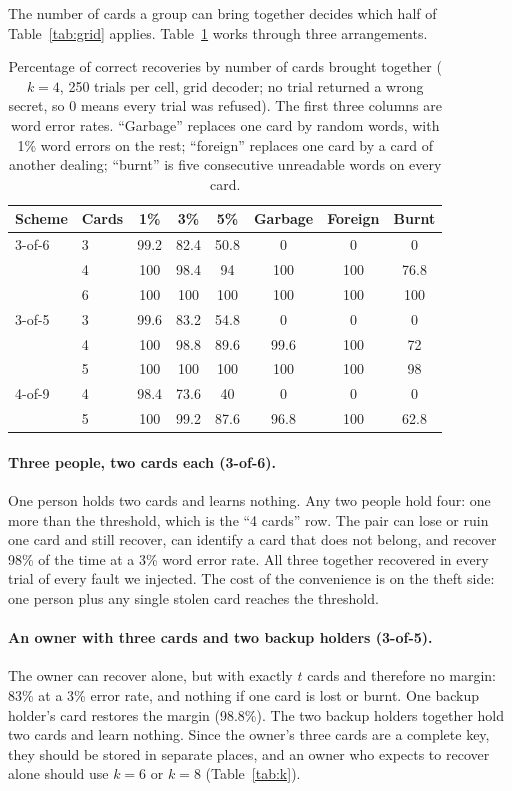 \documentclass[numeric]{anvil-paper}
\begin{document}
The number of cards a group can bring together decides which half of
Table~\ref{tab:grid} applies. Table~\ref{tab:scen} works through three
arrangements.

\begin{table}[tb]
\centering
\caption{Percentage of correct recoveries by number of cards brought together
($k=4$, 250 trials per cell, grid decoder; no trial returned a wrong secret,
so 0 means every trial was refused). The first three columns are word error
rates. ``Garbage'' replaces one card by random words, with 1\% word errors on
the rest; ``foreign'' replaces one card by a card of another dealing;
``burnt'' is five consecutive unreadable words on every card.}
\label{tab:scen}
\small
\begin{tabular}{llcccccc}
\toprule
Scheme & Cards & 1\% & 3\% & 5\% & Garbage & Foreign & Burnt \\
\midrule
3-of-6 & 3 & 99.2 & 82.4 & 50.8 & 0 & 0 & 0 \\
 & 4 & 100 & 98.4 & 94 & 100 & 100 & 76.8 \\
 & 6 & 100 & 100 & 100 & 100 & 100 & 100 \\
\midrule
3-of-5 & 3 & 99.6 & 83.2 & 54.8 & 0 & 0 & 0 \\
 & 4 & 100 & 98.8 & 89.6 & 99.6 & 100 & 72 \\
 & 5 & 100 & 100 & 100 & 100 & 100 & 98 \\
\midrule
4-of-9 & 4 & 98.4 & 73.6 & 40 & 0 & 0 & 0 \\
 & 5 & 100 & 99.2 & 87.6 & 96.8 & 100 & 62.8 \\
\bottomrule
\end{tabular}
\end{table}

\paragraph{Three people, two cards each (3-of-6).}
One person holds two cards and learns nothing. Any two people hold four: one
more than the threshold, which is the ``4 cards'' row. The pair can lose or
ruin one card and still recover, can identify a card that does not belong, and
recover 98\% of the time at a 3\% word error rate. All three together recovered
in every trial of every fault we injected. The cost of the convenience is on
the theft side: one person plus any single stolen card reaches the threshold.

\paragraph{An owner with three cards and two backup holders (3-of-5).}
The owner can recover alone, but with exactly $t$ cards and therefore no
margin: 83\% at a 3\% error rate, and nothing if one card is lost or burnt. One
backup holder's card restores the margin (98.8\%). The two backup holders
together hold two cards and learn nothing. Since the owner's three cards are a
complete key, they should be stored in separate places, and an owner who
expects to recover alone should use $k=6$ or $k=8$ (Table~\ref{tab:k}).
\end{document}
